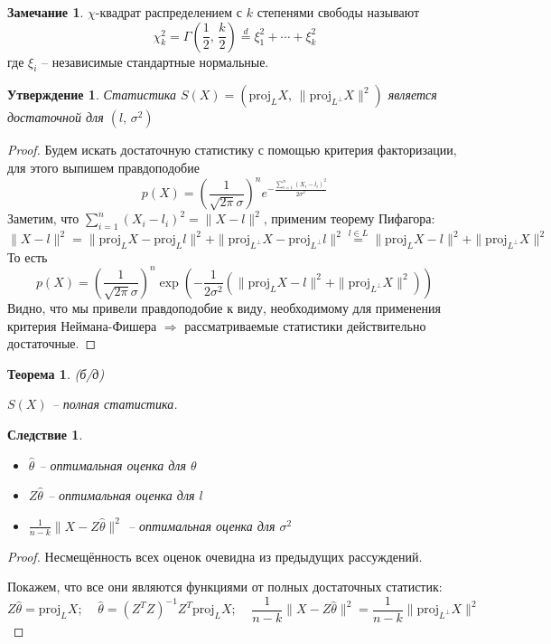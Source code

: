 \documentclass[a4paper,12pt]{article}
\theoremstyle{plain}
\newtheorem{theorem}{Теорема}[section]
\newtheorem{proposition}{Утверждение}[section]
\newtheorem*{corollary}{Следствие}
\theoremstyle{definition}
\newtheorem*{note}{Замечание}
\theoremstyle{remark}
\begin{document}
\begin{note}
  $\chi$-квадрат распределением с $k$ степенями свободы называют
  \[
    \chi^2_k = \Gamma\left(\frac{1}{2},\,\frac{k}{2}\right) \overset{d}{=} \xi_1^2 + \cdots + \xi_k^2
  \]
  где $\xi_i$ -- независимые стандартные нормальные.
\end{note}

\begin{proposition}
  Статистика $S(X) = (\text{proj}_LX,\, \|\text{proj}_{L^\bot}X\|^2)$ является достаточной для $(l,\,\sigma^2)$
\end{proposition}

\begin{proof}
  Будем искать достаточную статистику с помощью критерия факторизации, для этого выпишем правдоподобие
  \[
    p(X) = \left(\frac{1}{\sqrt{2\pi}\sigma}\right)^ne^{-\frac{\sum_{i = 1}^n(X_i - l_i)^2}{2\sigma^2}}
  \]
  Заметим, что $\sum_{i = 1}^n(X_i - l_i)^2 = \|X - l\|^2$, применим теорему Пифагора:
  \[
    \|X - l\|^2 = \|\text{proj}_LX - \text{proj}_Ll\|^2 + \|\text{proj}_{L^\bot}X - \text{proj}_{L^\bot}l\|^2 \overset{l \in L}{=} \|\text{proj}_LX - l\|^2 + \|\text{proj}_{L^\bot}X\|^2
  \]
  То есть
  \[
    p(X) = \left(\frac{1}{\sqrt{2\pi}\sigma}\right)^n\exp\left(-\frac{1}{2\sigma^2}(\|\text{proj}_LX - l\|^2 + \|\text{proj}_{L^\bot}X\|^2)\right)
  \]
  Видно, что мы привели правдоподобие к виду, необходимому для применения критерия Неймана-Фишера $\Rightarrow$ рассматриваемые статистики действительно достаточные.
\end{proof}

\begin{theorem}
  (б/д)
  
  $S(X)$ -- полная статистика. 
\end{theorem}

\begin{corollary}
  \begin{itemize}
    \item $\hat{\theta}$ -- оптимальная оценка для $\theta$
    \item $Z\hat{\theta}$ -- оптимальная оценка для $l$
    \item $\frac{1}{n - k}\|X - Z\hat{\theta}\|^2$ -- оптимальная оценка для $\sigma^2$
  \end{itemize}
\end{corollary}

\begin{proof}
  Несмещённость всех оценок очевидна из предыдущих рассуждений.

  Покажем, что все они являются функциями от полных достаточных статистик:  
  \[
    Z\hat{\theta} = \text{proj}_LX;\;\;\;\; \hat{\theta} = (Z^TZ)^{-1}Z^T\text{proj}_LX;\;\;\;\; \frac{1}{n - k}\|X - Z\hat{\theta}\|^2 = \frac{1}{n - k}\|\text{proj}_{L^\bot}X\|^2
  \]
\end{proof}
\end{document}
